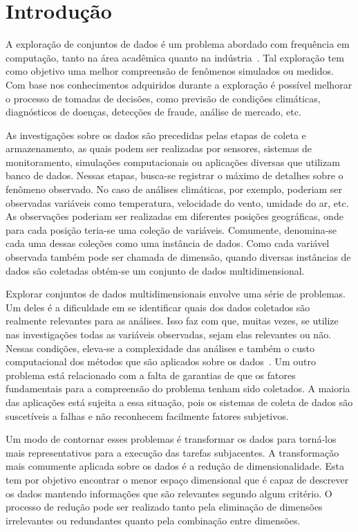 \chapter{Introdução}

A exploração de conjuntos de dados é um problema abordado
com frequência em computação, tanto na área acadêmica quanto
na indústria~\cite{Ngai2009,Harding2006}. Tal exploração tem
como objetivo uma melhor compreensão de fenômenos simulados
ou medidos. Com base nos conhecimentos adquiridos durante a
exploração é possível melhorar o processo de tomadas de
decisões, como previsão de condições climáticas,
diagnósticos de doenças, detecções de fraude, análise de
mercado, etc.

As investigações sobre os dados são precedidas pelas etapas
de coleta e armazenamento, as quais podem ser realizadas por
sensores, sistemas de monitoramento, simulações
computacionais ou aplicações diversas que utilizam banco de
dados. Nessas etapas, busca-se registrar o máximo de
detalhes sobre o fenômeno observado. No caso de análises
climáticas, por exemplo, poderiam ser observadas variáveis
como temperatura, velocidade do vento, umidade do ar, etc.
As observações poderiam ser realizadas em diferentes
posições geográficas, onde para cada posição teria-se uma
coleção de variáveis. Comumente, denomina-se cada uma dessas
coleções como uma instância de dados.  Como cada variável
observada também pode ser chamada de dimensão, quando
diversas instâncias de dados são coletadas obtém-se um
conjunto de dados multidimensional. 

Explorar conjuntos de dados multidimensionais envolve uma
série de problemas. Um deles é a dificuldade em se
identificar quais dos dados coletados são realmente
relevantes para as análises. Isso faz com que, muitas vezes,
se utilize nas investigações todas as variáveis observadas,
sejam elas relevantes ou não. Nessas condições, eleva-se a
complexidade das análises e também o custo computacional dos
métodos que são aplicados sobre os dados~\cite{Beyer1999}.
Um outro problema está relacionado com a falta de garantias
de que os fatores fundamentais para a compreensão do
problema tenham sido coletados. A maioria das aplicações
está sujeita a essa situação, pois os sistemas de coleta de
dados são suscetíveis a falhas e não reconhecem facilmente
fatores subjetivos. 

Um modo de contornar esses problemas é transformar os dados
para torná-los mais representativos para a execução das
tarefas subjacentes. A transformação mais comumente aplicada
sobre os dados é a redução de dimensionalidade. Esta tem
por objetivo encontrar o menor espaço dimensional que é
capaz de descrever os dados mantendo informações que são
relevantes segundo algum critério. O processo de redução
pode ser realizado tanto pela eliminação de dimensões
irrelevantes ou redundantes quanto pela combinação entre
dimensões. 

